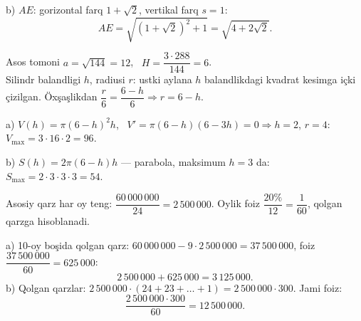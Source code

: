b) $AE$: gorizontal farq $1+\sqrt2$, vertikal farq $s=1$:
\[AE=\sqrt{(1+\sqrt2)^2+1}=\sqrt{4+2\sqrt2}.\]

\newpage
{}
Asos tomoni $a=\sqrt{144}=12$, \ $H=\dfrac{3\cdot288}{144}=6$.\\
Silindr balandligi $h$, radiusi $r$: ustki aylana $h$ balandlikdagi kvadrat kesimga içki çizilgan. Öxşaşlikdan $\dfrac r6=\dfrac{6-h}6\Rightarrow r=6-h$.

a) $V(h)=\pi(6-h)^2h$, \ $V'=\pi(6-h)(6-3h)=0\Rightarrow h=2$, $r=4$: \ $V_{\max}=3\cdot16\cdot2=96$.

b) $S(h)=2\pi(6-h)h$ — parabola, maksimum $h=3$ da: \ $S_{\max}=2\cdot3\cdot3\cdot3=54$.

\newpage
{}
Asosiy qarz har oy teng: $\dfrac{60\,000\,000}{24}=2\,500\,000$. Oylik foiz $\dfrac{20\%}{12}=\dfrac1{60}$, qolgan qarzga hisoblanadi.

a) 10-oy boşida qolgan qarz: $60\,000\,000-9\cdot2\,500\,000=37\,500\,000$, foiz $\dfrac{37\,500\,000}{60}=625\,000$:
\[2\,500\,000+625\,000=3\,125\,000.\]
b) Qolgan qarzlar: $2\,500\,000\cdot(24+23+\dots+1)=2\,500\,000\cdot300$. Jami foiz:
\[\frac{2\,500\,000\cdot300}{60}=12\,500\,000.\]

\ShowJavoblar

